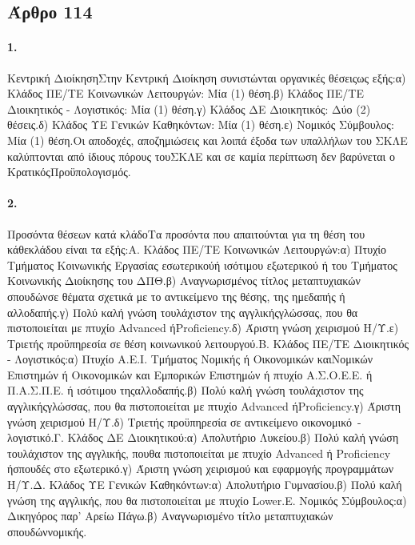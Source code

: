 \documentclass[a4paper,oneside, 10pt]{book}
\begin{document}
\subsection*{ Άρθρο 114 }
\paragraph { 1. } Κεντρική ΔιοίκησηΣτην Κεντρική Διοίκηση συνιστώνται οργανικές θέσειςως εξής:α) Κλάδος ΠΕ/ΤΕ Κοινωνικών Λειτουργών: Μία (1) θέση.β) Κλάδος ΠΕ/ΤΕ Διοικητικός - Λογιστικός: Μία (1) θέση.γ) Κλάδος ΔΕ Διοικητικός: Δύο (2) θέσεις.δ) Κλάδος ΥΕ Γενικών Καθηκόντων: Μία (1) θέση.ε) Νομικός Σύμβουλος: Μία (1) θέση.Οι αποδοχές, αποζημιώσεις και λοιπά έξοδα των υπαλλήλων του ΣΚΛΕ καλύπτονται από ίδιους πόρους τουΣΚΛΕ και σε καμία περίπτωση δεν βαρύνεται ο ΚρατικόςΠροϋπολογισμός.
\paragraph { 2. } Προσόντα θέσεων κατά κλάδοΤα προσόντα που απαιτούνται για τη θέση του κάθεκλάδου είναι τα εξής:Α. Κλάδος ΠΕ/ΤΕ Κοινωνικών Λειτουργών:α) Πτυχίο Τμήματος Κοινωνικής Εργασίας εσωτερικούή ισότιμου εξωτερικού ή του Τμήματος Κοινωνικής Διοίκησης του ΔΠΘ.β) Αναγνωρισμένος τίτλος μεταπτυχιακών σπουδώνσε θέματα σχετικά με το αντικείμενο της θέσης, της ημεδαπής ή αλλοδαπής.γ) Πολύ καλή γνώση τουλάχιστον της αγγλικήςγλώσσας, που θα πιστοποιείται με πτυχίο Advanced ήProficiency.δ) Άριστη γνώση χειρισμού Η/Υ.ε) Τριετής προϋπηρεσία σε θέση κοινωνικού λειτουργού.Β. Κλάδος ΠΕ/ΤΕ Διοικητικός - Λογιστικός:α) Πτυχίο Α.Ε.Ι. Τμήματος Νομικής ή Οικονομικών καιΝομικών Επιστημών ή Οικονομικών και Εμπορικών Επιστημών ή πτυχίο Α.Σ.Ο.Ε.Ε. ή Π.Α.Σ.Π.Ε. ή ισότιμου τηςαλλοδαπής.β) Πολύ καλή γνώση τουλάχιστον της αγγλικήςγλώσσας, που θα πιστοποιείται με πτυχίο Advanced ήProficiency.γ) Άριστη γνώση χειρισμού Η/Υ.δ) Τριετής προϋπηρεσία σε αντικείμενο οικονομικό -λογιστικό.Γ. Κλάδος ΔΕ Διοικητικού:α) Απολυτήριο Λυκείου.β) Πολύ καλή γνώση τουλάχιστον της αγγλικής, πουθα πιστοποιείται με πτυχίο Advanced ή Proficiency ήσπουδές στο εξωτερικό.γ) Άριστη γνώση χειρισμού και εφαρμογής προγραμμάτων Η/Υ.Δ. Κλάδος ΥΕ Γενικών Καθηκόντων:α) Απολυτήριο Γυμνασίου.β) Πολύ καλή γνώση της αγγλικής, που θα πιστοποιείται με πτυχίο Lower.E. Νομικός Σύμβουλος:α) Δικηγόρος παρ’ Αρείω Πάγω.β) Αναγνωρισμένο τίτλο μεταπτυχιακών σπουδώννομικής.
\end{document}
